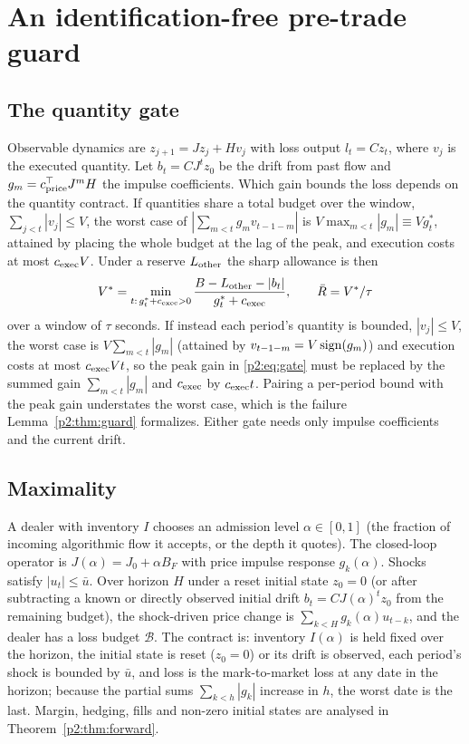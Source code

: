 \section{An identification-free pre-trade guard}\label{p2:sec:guard}

\subsection{The quantity gate}
Observable dynamics are $z_{j+1}=Jz_j+Hv_j$ with loss output $l_t=Cz_t$, where $v_j$ is the executed quantity. Let $b_t=CJ^tz_0$ be the drift from past flow and $g_m=c^\top_{\rm price}J^mH$ the impulse coefficients. Which gain bounds the loss depends on the quantity contract. If quantities share a total budget over the window, $\sum_{j<t}|v_j|\le V$, the worst case of $|\sum_{m<t}g_mv_{t-1-m}|$ is $V\max_{m<t}|g_m|\equiv Vg^*_t$, attained by placing the whole budget at the lag of the peak, and execution costs at most $c_{\rm exec}V$. Under a reserve $L_{\rm other}$ the sharp allowance is then
\begin{equation}\label{p2:eq:gate}
V^*=\min_{t:\,g^*_t+c_{\rm exec}>0}\frac{B-L_{\rm other}-|b_t|}{g^*_t+c_{\rm exec}},\qquad\bar R=V^*/\tau
\end{equation}
over a window of $\tau$ seconds. If instead each period's quantity is bounded, $|v_j|\le V$, the worst case is $V\sum_{m<t}|g_m|$ (attained by $v_{t-1-m}=V\,{\rm sign}(g_m)$) and execution costs at most $c_{\rm exec}Vt$, so the peak gain in \eqref{p2:eq:gate} must be replaced by the summed gain $\sum_{m<t}|g_m|$ and $c_{\rm exec}$ by $c_{\rm exec}t$. Pairing a per-period bound with the peak gain understates the worst case, which is the failure Lemma~\ref{p2:thm:guard} formalizes. Either gate needs only impulse coefficients and the current drift.

\subsection{Maximality}
A dealer with inventory $I$ chooses an admission level $\alpha\in[0,1]$ (the fraction of incoming algorithmic flow it accepts, or the depth it quotes). The closed-loop operator is $J(\alpha)=J_0+\alpha B_F$ with price impulse response $g_k(\alpha)$. Shocks satisfy $|u_t|\le\bar u$. Over horizon $H$ under a reset initial state $z_0=0$ (or after subtracting a known or directly observed initial drift $b_t=CJ(\alpha)^t z_0$ from the remaining budget), the shock-driven price change is $\sum_{k<H}g_k(\alpha)u_{t-k}$, and the dealer has a loss budget $\mathcal B$. The contract is: inventory $I(\alpha)$ is held fixed over the horizon, the initial state is reset ($z_0=0$) or its drift is observed, each period's shock is bounded by $\bar u$, and loss is the mark-to-market loss at any date in the horizon; because the partial sums $\sum_{k<h}|g_k|$ increase in $h$, the worst date is the last. Margin, hedging, fills and non-zero initial states are analysed in Theorem~\ref{p2:thm:forward}.

